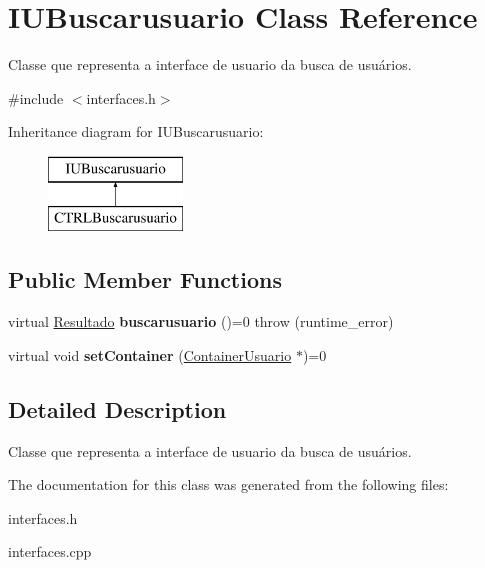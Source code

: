 \hypertarget{classIUBuscarusuario}{}\section{I\+U\+Buscarusuario Class Reference}
\label{classIUBuscarusuario}


Classe que representa a interface de usuario da busca de usuários.  




{\ttfamily \#include $<$interfaces.\+h$>$}

Inheritance diagram for I\+U\+Buscarusuario\+:\begin{figure}[H]
\begin{center}
\leavevmode
\includegraphics[height=2.000000cm]{classIUBuscarusuario}
\end{center}
\end{figure}
\subsection*{Public Member Functions}
\begin{DoxyCompactItemize}
\item 
\mbox{\label{classIUBuscarusuario_a325a581f5e61a973ced408613a12af0e}} 
virtual \hyperlink{classResultado}{Resultado} {\bfseries buscarusuario} ()=0  throw (runtime\+\_\+error)
\item 
\mbox{\label{classIUBuscarusuario_acee43910719a0e8b0f70ee1f0c189535}} 
virtual void {\bfseries set\+Container} (\hyperlink{classContainerUsuario}{Container\+Usuario} $\ast$)=0
\end{DoxyCompactItemize}


\subsection{Detailed Description}
Classe que representa a interface de usuario da busca de usuários. 

The documentation for this class was generated from the following files\+:\begin{DoxyCompactItemize}
\item 
interfaces.\+h\item 
interfaces.\+cpp\end{DoxyCompactItemize}
